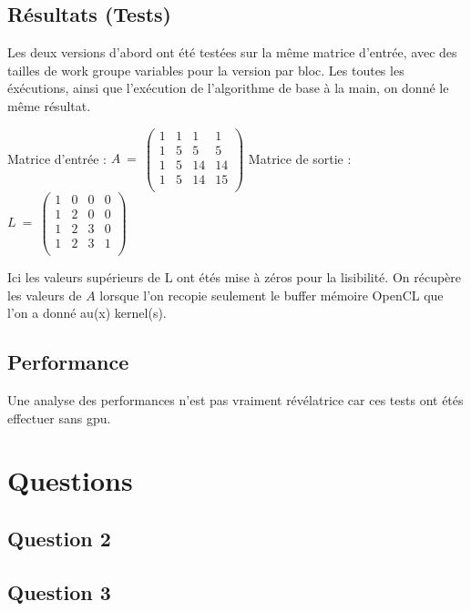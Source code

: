 \documentclass[paper=a4, fontsize=11pt]{scrartcl} %
\numberwithin{equation}{section} %
\numberwithin{figure}{section} %
\numberwithin{table}{section} %
\begin{document}
\subsection{Résultats (Tests)}
Les deux versions d'abord ont été testées sur la même matrice
d'entrée, avec des tailles de work groupe variables pour la version
par bloc. Les toutes les éxécutions, ainsi que l'exécution de
l'algorithme de base à la main, on donné le même résultat.

\begin{centering}
Matrice d'entrée : $A\ =\ \left( \begin{array}{cccc}
1&1&1&1 \\
1&5&5&5 \\
1&5&14&14 \\
1&5&14&15 \\
\end{array} \right) $
Matrice de sortie : $L\ =\ \left( \begin{array}{cccc}
1&0&0&0 \\
1&2&0&0 \\
1&2&3&0 \\
1&2&3&1 \\
\end{array} \right) $
\end{centering}

Ici les valeurs supérieurs de L ont étés mise à zéros pour la
lisibilité. On récupère les valeurs de $A$ lorsque l'on recopie
seulement le buffer mémoire OpenCL que l'on a donné au(x) kernel(s).


\subsection{Performance}
Une analyse des performances n'est pas vraiment révélatrice car ces
tests ont étés effectuer sans gpu. 

\section{Questions}

\subsection{Question 2}
\subsection{Question 3}
\end{document}
